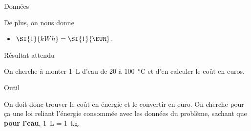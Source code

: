 \documentclass[a4paper, 12pt, final, garamond]{book}
\begin{document}
\begin{enumerate}
\begin{tcbraster}[raster columns=2, raster equal height=rows]
\begin{NCdefi}[]{Données}
\begin{itemize}
                \end{itemize}
                De plus, on nous donne
                \begin{itemize}
                    \item $ \SI{1}{kWh} = \SI{1}{\EUR}$.
                \end{itemize}
            \end{NCdefi}
            \begin{tcolorbox}[blankest, raster multicolumn=1, space to=\myspace]
                \begin{tcbraster}[raster columns=1]
                    \begin{NCprop}[add to natural height=\myspace]{Résultat attendu}

                        On cherche à monter \SI{1}{L} d'eau de 20 à
                        \SI{100}{\degreeCelsius} et d'en calculer le coût en
                        euros.

                    \end{NCprop}
                    \begin{NCrapp}[]{Outil}

                        On doit donc trouver le coût en énergie et le convertir
                        en euro. On cherche pour ça une loi reliant l'énergie
                        consommée avec les données du problème, sachant que
                        \textbf{pour l'eau}, \SI{1}{L} = \SI{1}{kg}.


\end{NCrapp}
\end{tcbraster}
\end{tcolorbox}
\end{tcbraster}
\end{enumerate}
\end{document}
